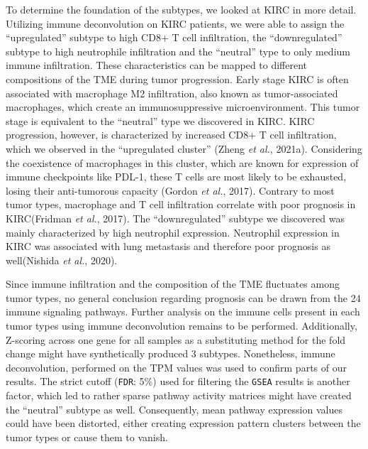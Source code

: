 \documentclass[
  parskip,
  oneside]{scrreprt}
\begin{document}
To determine the foundation of the subtypes, we looked at KIRC in more
detail. Utilizing immune deconvolution on KIRC patients, we were able to
assign the ``upregulated'' subtype to high CD8+ T cell infiltration, the
``downregulated'' subtype to high neutrophile infiltration and the
``neutral'' type to only medium immune infiltration. These
characteristics can be mapped to different compositions of the TME
during tumor progression. Early stage KIRC is often associated with
macrophage M2 infiltration, also known as tumor-associated macrophages,
which create an immunosuppressive microenvironment. This tumor stage is
equivalent to the ``neutral'' type we discovered in KIRC. KIRC
progression, however, is characterized by increased CD8+ T cell
infiltration, which we observed in the ``upregulated cluster'' (Zheng
\emph{et al.}, 2021a). Considering the coexistence of macrophages in
this cluster, which are known for expression of immune checkpoints like
PDL-1, these T cells are most likely to be exhausted, losing their
anti-tumorous capacity (Gordon \emph{et al.}, 2017). Contrary to most
tumor types, macrophage and T cell infiltration correlate with poor
prognosis in KIRC(Fridman \emph{et al.}, 2017). The ``downregulated''
subtype we discovered was mainly characterized by high neutrophil
expression. Neutrophil expression in KIRC was associated with lung
metastasis and therefore poor prognosis as well(Nishida \emph{et al.},
2020).

Since immune infiltration and the composition of the TME fluctuates
among tumor types, no general conclusion regarding prognosis can be
drawn from the 24 immune signaling pathways. Further analysis on the
immune cells present in each tumor types using immune deconvolution
remains to be performed. Additionally, Z-scoring across one gene for all
samples as a substituting method for the fold change might have
synthetically produced 3 subtypes. Nonetheless, immune deconvolution,
performed on the TPM values was used to confirm parts of our results.
The strict cutoff (\texttt{FDR}: 5\%) used for filtering the
\texttt{GSEA} results is another factor, which led to rather sparse
pathway activity matrices might have created the ``neutral'' subtype as
well. Consequently, mean pathway expression values could have been
distorted, either creating expression pattern clusters between the tumor
types or cause them to vanish.
\end{document}
